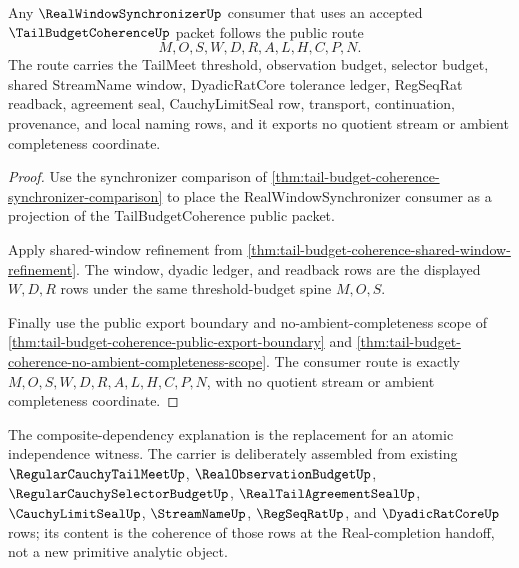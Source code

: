 \begin{theorem}
\label{thm:tail-budget-coherence-real-window-consumer-route}
Any $\RealWindowSynchronizerUp$ consumer that uses an accepted $\TailBudgetCoherenceUp$ packet follows the public route
$$
M,O,S,W,D,R,A,L,H,C,P,N.
$$
The route carries the TailMeet threshold, observation budget, selector budget, shared StreamName window, DyadicRatCore tolerance ledger, RegSeqRat readback, agreement seal, CauchyLimitSeal row, transport, continuation, provenance, and local naming rows, and it exports no quotient stream or ambient completeness coordinate.
\end{theorem}
\begin{proof}
Use the synchronizer comparison of \autoref{thm:tail-budget-coherence-synchronizer-comparison} to place the RealWindowSynchronizer consumer as a projection of the TailBudgetCoherence public packet.

Apply shared-window refinement from \autoref{thm:tail-budget-coherence-shared-window-refinement}. The window, dyadic ledger, and readback rows are the displayed $W,D,R$ rows under the same threshold-budget spine $M,O,S$.

Finally use the public export boundary and no-ambient-completeness scope of \autoref{thm:tail-budget-coherence-public-export-boundary} and \autoref{thm:tail-budget-coherence-no-ambient-completeness-scope}. The consumer route is exactly $M,O,S,W,D,R,A,L,H,C,P,N$, with no quotient stream or ambient completeness coordinate.
\end{proof}


The composite-dependency explanation is the replacement for an atomic independence witness. The carrier is deliberately assembled from existing $\RegularCauchyTailMeetUp$, $\RealObservationBudgetUp$, $\RegularCauchySelectorBudgetUp$, $\RealTailAgreementSealUp$, $\CauchyLimitSealUp$, $\StreamNameUp$, $\RegSeqRatUp$, and $\DyadicRatCoreUp$ rows; its content is the coherence of those rows at the Real-completion handoff, not a new primitive analytic object.


